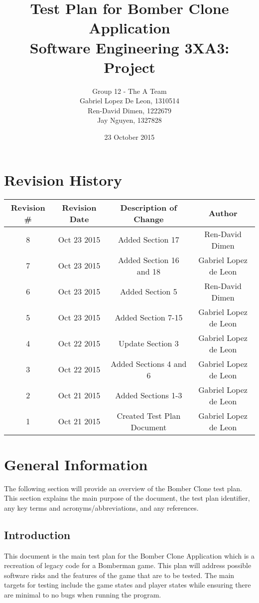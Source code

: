 \documentclass[12pt, letterpaper]{article}
\title{\textbf{Test Plan for Bomber Clone Application \\ \Large Software Engineering 3XA3: Project}}
\author{Group 12 - The A Team \\Gabriel Lopez De Leon, 1310514\\Ren-David Dimen, 1222679\\Jay Nguyen, 1327828}
\date{23 October 2015}
\begin{document}
	
	\begin{titlepage}
		\clearpage\maketitle
		\thispagestyle{empty}
	\end{titlepage}
	
	\newpage
	\tableofcontents
	\newpage
	
	\section{Revision History}
	
		\begin{tabular}{ |c|c|c|c| } 
			\hline
			\textbf{Revision \#} & \textbf{Revision Date} & \textbf{Description of Change} & \textbf{Author}\\
			\hline
			8 & Oct 23 2015 & Added Section 17 & Ren-David Dimen\\
			\hline
			7 & Oct 23 2015 & Added Section 16 and 18 & Gabriel Lopez de Leon\\
			\hline
			6 & Oct 23 2015 & Added Section 5 & Ren-David Dimen\\
			\hline
			5 & Oct 23 2015 & Added Section 7-15 & Gabriel Lopez de Leon\\
			\hline
			4 & Oct 22 2015 & Update Section 3 & Gabriel Lopez de Leon\\
			\hline
			3 & Oct 22 2015 & Added Sections 4 and 6 & Gabriel Lopez de Leon\\
			\hline
			2 & Oct 21 2015 & Added Sections 1-3 & Gabriel Lopez de Leon\\
			\hline
			1 & Oct 21 2015 & Created Test Plan Document & Gabriel Lopez de Leon\\
			\hline
		\end{tabular}
	
	\newpage
	
	\section{General Information}
	\indent \indent The following section will provide an overview of the Bomber Clone test plan. This section explains the main purpose of the document, the test plan identifier, any key terms and acronyms/abbreviations, and any references.
	
	\subsection{Introduction}
	\indent \indent This document is the main test plan for the Bomber Clone Application which is a recreation of legacy code for a Bomberman game. This plan will address possible software risks and the features of the game that are to be tested. The main targets for testing include the game states and player states while ensuring there are minimal to no bugs when running the program.\\
	
\end{document}
